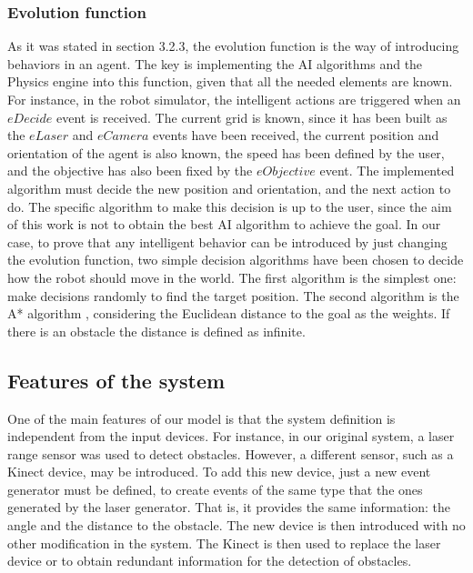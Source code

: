 \documentclass{aamas2012}
\begin{document}
\subsubsection{Evolution function
\label{sec:CaseEvolFunction}}

As it was stated in section 3.2.3, the evolution function is the way of introducing behaviors in an agent. The key is implementing the AI algorithms and the Physics engine into this function, given that all the needed elements are known. For instance, in the robot simulator, the intelligent actions are triggered when an $eDecide$ event is received. The current grid is known, since it has been built as the $eLaser$ and $eCamera$ events have been received, the current position and orientation of the agent is also known, the speed has been defined by the user, and the objective has also been fixed by the $eObjective$ event. The implemented algorithm must decide the new position and orientation, and the next action to do. The specific algorithm to make this decision is up to the user, since the aim of this work is not to obtain the best AI algorithm to achieve the goal. In our case, to prove that any intelligent behavior can be introduced by just changing the evolution function, two simple decision algorithms have been chosen to decide how the robot should move in the world. The first algorithm is the simplest one: make decisions randomly to find the target position. The second algorithm is the A* algorithm  \cite{Luo2010}, considering the Euclidean distance to the goal as the weights. If there is an obstacle the distance is defined as infinite. 

\subsection{Features of the system}

One of the main features of our model is that the system definition is independent from the input devices. For instance, in our original system, a laser range sensor was used to detect obstacles. However, a different sensor, such as a Kinect device, may be introduced. To add this new device,  just a new event generator must be defined,  to create events of the same type that the ones generated by the laser generator. That is, it provides the same information: the angle and the distance to the obstacle. The new device is then introduced with no other modification in the system. The Kinect is then used to replace the laser device or to obtain redundant information for the detection of obstacles.
\end{document}

